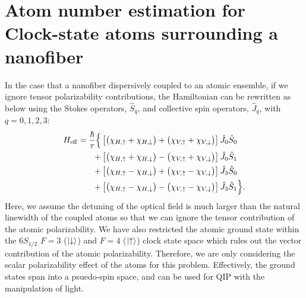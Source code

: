 \chapter[Atom number estimation with atoms surrounding a nanofiber]{Atom number estimation for Clock-state atoms surrounding a nanofiber}
In the case that a nanofiber dispersively coupled to an atomic ensemble, if we ignore tensor 
polarizability contributions, the Hamiltonian can be rewritten as below using the Stokes operators, $ 
\hat{S}_q $, and collective spin operators, $ \hat{J}_q $, with $ q=0,1,2,3 $:
\begin{align}
H_{\rm eff} 
=\frac{\hbar}{\tau} \Big\{ & \left[ \big( \chi_{H,\uparrow} + \chi_{H,\downarrow}\big) + \big(\chi_{V,\uparrow} + \chi_{V,\downarrow}\big) \right] \hat{J}_0 \hat{S}_0 \nonumber \\
+ & \left[ \big( \chi_{H, \uparrow} + \chi_{H,\downarrow}\big) - \big( \chi_{V,\uparrow} + \chi_{V,\downarrow} \big)\right]  \hat{J}_0 \hat{S}_1 \nonumber \\
+ & \left[ \big( \chi_{H,\uparrow} - \chi_{H,\downarrow}\big) + \big(\chi_{V,\uparrow} - \chi_{V,\downarrow} \big) \right] \hat{J}_3 \hat{S}_0 \nonumber \\
+ & \left[ \big( \chi_{H,\uparrow} - \chi_{H,\downarrow}\big) - \big(\chi_{V,\uparrow} - \chi_{V,\downarrow} \big) \right]  \hat{J}_3 \hat{S}_1\Big\}.\label{eq:JScoupling}
\end{align}
Here, we assume the detuning of the optical field is much larger than the natural linewidth of the 
coupled atoms so that we can ignore the tensor contribution of the atomic polarizability. We have also 
restricted the atomic ground state within the $ 6S_{1/2} $ $ F=3 $ ($ \lvert{\downarrow}\rangle $) and $ F=4 $ ($ 
\lvert{\uparrow}\rangle $) clock state space which rules out the vector contribution of 
the atomic polarizability. Therefore, we are only considering the scalar polarizability effect of the atoms 
for this problem. Effectively, the ground states span into a psuedo-spin space, and 
can be used for QIP with the manipulation of light. 

